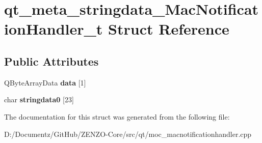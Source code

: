 \hypertarget{structqt__meta__stringdata___mac_notification_handler__t}{}\section{qt\+\_\+meta\+\_\+stringdata\+\_\+\+Mac\+Notification\+Handler\+\_\+t Struct Reference}
\label{structqt__meta__stringdata___mac_notification_handler__t}
\subsection*{Public Attributes}
\begin{DoxyCompactItemize}
\item 
\mbox{\label{structqt__meta__stringdata___mac_notification_handler__t_ab87489470ba5622edb8a334d6a5a9bfb}} 
Q\+Byte\+Array\+Data {\bfseries data} \mbox{[}1\mbox{]}
\item 
\mbox{\label{structqt__meta__stringdata___mac_notification_handler__t_ac83facf6b6391440e8a4520ee7d7e409}} 
char {\bfseries stringdata0} \mbox{[}23\mbox{]}
\end{DoxyCompactItemize}


The documentation for this struct was generated from the following file\+:\begin{DoxyCompactItemize}
\item 
D\+:/\+Documentz/\+Git\+Hub/\+Z\+E\+N\+Z\+O-\/\+Core/src/qt/moc\+\_\+macnotificationhandler.\+cpp\end{DoxyCompactItemize}
